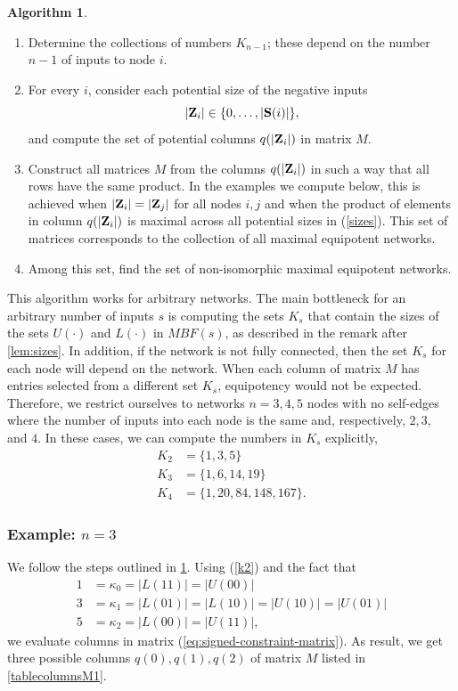 \documentclass[12pt]{amsart}
\newcommand{\bZ}{{\bf Z}}
\newcommand{\Sources}{\mathbf{S}}
\theoremstyle{definition}
\newtheorem{algorithm}[thm]{Algorithm}
\begin{document}
\begin{algorithm}\label{outline} 
\begin{enumerate} 
\item Determine the collections of numbers $K_{n-1}$; these depend on the number $n-1$ of inputs to node $i$.
\item For every $i$, consider each potential size of the negative inputs 
\begin{equation} \label{sizes} 
|\bZ_i| \in \{0, \ldots, |\Sources(i)|\},
\end{equation}
and compute the set of potential columns $q(|\bZ_i|)$ in matrix $M$.
\item Construct all matrices $M$ from the columns $q(|\bZ_i|)$ in such a way that all rows have the same product. In the examples we compute below, this is achieved when $|\bZ_i| = |\bZ_j|$ for all nodes $i,j$ and when the product of elements in column $q(|\bZ_i|)$ is maximal across all potential sizes in (\ref{sizes}). This set of matrices corresponds to the collection of all maximal equipotent networks.
\item Among this set, find the set of non-isomorphic maximal equipotent networks.
\end{enumerate}
\end{algorithm}
This algorithm works for arbitrary networks. The main bottleneck for an arbitrary number of inputs $s$ is computing the sets $K_s$ that contain the sizes of the sets $U(\cdot)$ and $L(\cdot)$ in $MBF(s)$, as described in the remark after \cref{lem:sizes}. In addition, if the network is not fully connected, then the set $K_s$ for each node will depend on the network. When each column of matrix $M$ has entries selected from a different set $K_s$, equipotency would not be expected. Therefore, we restrict ourselves to networks $n=3,4,5$ nodes with no self-edges where the number of inputs into each node is the same and, respectively, $2,3,$ and $4$. In these cases, we can compute the numbers in $K_s$ explicitly, 
\begin{align}
    K_2&=\{1,3,5\} \label{k2}\\
    K_3&=\{1,6,14,19\} \label{k3}\\
    K_4&=\{1,20,84, 148, 167\}.\label{k4}
\end{align}

\subsubsection*{Example: $n=3$ }
We follow the steps outlined in \cref{outline}. Using (\ref{k2}) and the fact that \begin{align*}
    1 &= \kappa_0 = |L(11)|=|U(00)| \\
    3 &= \kappa_1 = |L(01)|=|L(10)|=|U(10)|=|U(01)| \\
    5 &= \kappa_2 = |L(00)|=|U(11)| ,
\end{align*}
we evaluate columns in matrix (\ref{eq:signed-constraint-matrix}). As result, we get three possible columns $q(0),q(1), q(2)$ of matrix $M$ listed in \cref{tablecolumnsM1}. 
\end{document}
